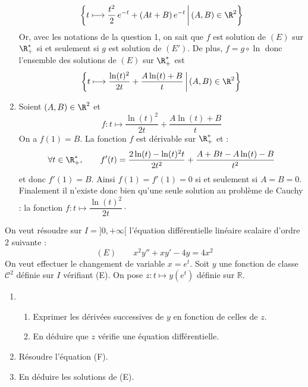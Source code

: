 \documentclass[a4paper,10pt]{report}
\begin{document}
\begin{enumerate}
$$
\bigg\{t \longmapsto \dfrac{t^2}{2}\,e^{-t}+(At+B)\,e^{-t}\,\bigg|\,(A,B)\in \R^2\bigg\}
$$
Or, avec les notations de la question 1, on sait que $f$ est solution de $(E)$ sur $\R_+^*$ si et seulement si $g$ est solution de $(E')$. De plus, $f=g\circ \ln$ donc l'ensemble des solutions de $(E)$ sur $\R_+^*$ est 
$$\bigg\{t \longmapsto \frac{\ln(t)^2}{2t}+\frac{A\ln(t)+B}{t}\,\bigg|\,(A,B)\in \R^2\bigg\}$$
\item Soient $(A,B)\in \R^2$ et 
$$f : t \longmapsto \dfrac{\ln(t)^2}{2t}+\dfrac{A\ln(t)+B}{t}$$
 On a $f(1)=B$. La fonction $f$ est dérivable sur $\R_+^*$ et :
$$
\forall t\in \R_+^*,\qquad f'(t)=\frac{2\ln(t)-\ln(t)^2t}{2t^2}+\frac{A+Bt-A\ln(t)-B}{t^2}
$$
et donc $f'(1)=B$. Ainsi $f(1)=f'(1)=0$ si et seulement si $A=B=0$. Finalement il n'existe donc bien qu'une seule solution au problème de Cauchy : la fonction $f : t \longmapsto \dfrac{\ln(t)^2}{2t} \cdot$
\end{enumerate}

\begin{Exa} On veut résoudre sur $I=]0,+\infty[$ l'équation  différentielle linéaire scalaire d'ordre $2$ suivante :
$$ (E) \qquad x^2y''+xy' -4y = 4x^2$$
On veut effectuer le changement de variable $x=e^t$. Soit $y$ une fonction de classe $\mathcal C^2$ définie sur $I$ vérifiant (E). On pose $z : t \mapsto y(e^t)$ définie sur $\mathbb R$. 

\begin{enumerate}
\item
\begin{enumerate}
\item Exprimer les dérivées successives de $y$ en fonction de celles de $z$.
\item En déduire que $z$ vérifie une équation différentielle.
\end{enumerate}
\item Résoudre l'équation (F).
\item En déduire les solutions de (E).
\end{enumerate}
\end{Exa}

\corr
\end{document}
